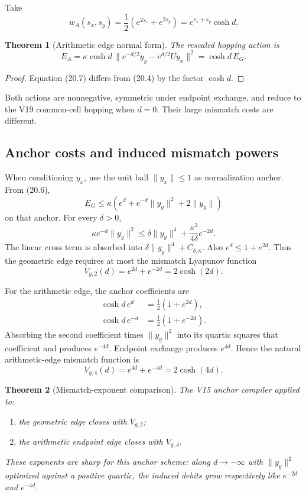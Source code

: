 \documentclass[11pt]{article}
\newtheorem{theorem}{Theorem}[section]
\theoremstyle{remark}
\begin{document}
Take
\[
 w_A(s_x,s_y)
 =\frac12(e^{2s_x}+e^{2s_y})
 =e^{s_x+s_y}\cosh d.                              \tag{20.7}
\]

\begin{theorem}[Arithmetic edge normal form]
\label{thm:v17v20-arithmetic}
The rescaled hopping action is
\[
\boxed{
 E_A
 =\kappa\cosh d\,
 \|e^{-d/2}y_y-e^{d/2}Uy_x\|^2
 =\cosh d\,E_G.}                                   \tag{20.8}
\]
\end{theorem}

\begin{proof}
Equation (20.7) differs from (20.4) by the factor \(\cosh d\).
\end{proof}

Both actions are nonnegative, symmetric under endpoint exchange,
and reduce to the V19 common-cell hopping when \(d=0\).  Their
large mismatch costs are different.

\subsection{Anchor costs and induced mismatch powers}

When conditioning \(y_x\), use the unit ball
\(\|y_x\|\leq1\) as normalization anchor.  From (20.6),
\[
 E_G
 \leq\kappa\left(
 e^d+e^{-d}\|y_y\|^2+2\|y_y\|
 \right)                                           \tag{20.9}
\]
on that anchor.  For every \(\delta>0\),
\[
 \kappa e^{-d}\|y_y\|^2
 \leq
 \delta\|y_y\|^4+
 \frac{\kappa^2}{4\delta}e^{-2d}.                 \tag{20.10}
\]
The linear cross term is absorbed into
\(\delta\|y_y\|^4+C_{\delta,\kappa}\).
Also \(e^d\leq1+e^{2d}\).  Thus the geometric edge requires at most
the mismatch Lyapunov function
\[
 V_{g,2}(d)=e^{2d}+e^{-2d}=2\cosh(2d).             \tag{20.11}
\]

For the arithmetic edge, the anchor coefficients are
\[
\begin{aligned}
 \cosh d\,e^d&=\tfrac12(1+e^{2d}),\\
 \cosh d\,e^{-d}&=\tfrac12(1+e^{-2d}).
\end{aligned}                                                       \tag{20.12}
\]
Absorbing the second coefficient times \(\|y_y\|^2\) into its
quartic squares that coefficient and produces \(e^{-4d}\).
Endpoint exchange produces \(e^{4d}\).  Hence the natural
arithmetic-edge mismatch function is
\[
 V_{g,4}(d)=e^{4d}+e^{-4d}=2\cosh(4d).             \tag{20.13}
\]

\begin{theorem}[Mismatch-exponent comparison]
\label{thm:v17v20-mismatch}
The V15 anchor compiler applied to:
\begin{enumerate}
\item the geometric edge closes with \(V_{g,2}\);
\item the arithmetic endpoint edge closes with \(V_{g,4}\).
\end{enumerate}
These exponents are sharp for this anchor scheme: along
\(d\to-\infty\) with \(\|y_y\|^2\) optimized against a positive
quartic, the induced debits grow respectively like
\(e^{-2d}\) and \(e^{-4d}\).
\end{theorem}
\end{document}
